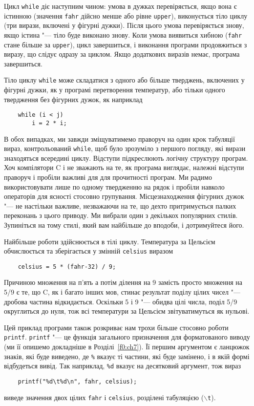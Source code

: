 \documentclass[a4paper,12pt]{book}
\begin{document}
  Цикл \texttt{while} діє наступним чином: умова в дужках перевіряється, якщо вона є
  істинною (значення \texttt{fahr} дійсно менше або рівне \texttt{upper}), виконується
  тіло циклу (три вирази, включені у фігурні дужки). Після цього умова перевіряється
  знову, якщо істина "--- тіло буде виконано знову. Коли умова виявиться хибною
  (\texttt{fahr} стане більше за \texttt{upper}), цикл завершиться, і виконання програми
  продовжиться з виразу, що слідує одразу за циклом. Якщо додаткових виразів немає,
  програма завершиться.

  Тіло циклу
  \texttt{while} може складатися з одного або більше тверджень, включених у фігурні
  дужки, як у програмі перетворення температур, або тільки одного твердження без фігурних
  дужок, як наприклад
  \begin{verbatim}
    while (i < j)
        i = 2 * i;
  \end{verbatim}

  В обох випадках, ми завжди зміщуватимемо праворуч на один крок табуляції вираз,
  контрольований \texttt{while}, щоб було зрозуміло з першого погляду, які вирази
  знаходяться всередині циклу. Відступи підкреслюють логічну структуру програм. Хоч
  компілятори C і не зважають на те, як програма виглядає, належні відступи праворуч і
  пробіли важливі для для прочитності програм. Ми радимо використовувати лише по одному
  твердженню на рядок і пробіли навколо операторів для ясності стосовно групування.
  Місцезнаходження фігурних дужок "--- не настільки важливе, незважаючи на те, що дехто
  притримується палких переконань з цього приводу. Ми вибрали один з декількох популярних
  стилів. Зупиніться на тому стилі, який вам найбільше до вподоби, і дотримуйтеся його.

  Найбільше роботи здійснюється в тілі циклу. Температура за Цельсієм обчислюється та
  зберігається у змінній \texttt{celsius} виразом
  \begin{verbatim}
    celsius = 5 * (fahr-32) / 9;
  \end{verbatim}

  Причиною множення на п'ять а потім ділення на 9 замість просто множення на 5/9 є
  те, що C, як і багато інших мов, стинає результат поділу цілих чисел "--- дробова частина
  відкидається. Оскільки 5 і 9 "--- обидва цілі числа, поділ 5/9 округлиться до нуля, тож
  всі температури за Цельсієм звітуватимуться як нульові.

  Цей приклад програми також розкриває нам трохи більше стосовно роботи \texttt{printf}.
  \texttt{printf} "--- це функція загального призначення для форматованого виводу (ми
  її опишемо докладніше в Розділі~\ref{f0:ch7}). Її першим аргументом є ланцюжок
  знаків, які буде виведено, де \texttt{\%} вказує ті частини, які буде замінено, і в якій
  формі відбудеться вивід. Так наприклад, \texttt{\%d} вказує на десятковий аргумент, тож
  вираз
  \begin{verbatim}
    printf("%d\t%d\n", fahr, celsius);
  \end{verbatim}
  виведе значення двох цілих \texttt{fahr} і \texttt{celsius}, розділені табуляцією
  (\texttt{\mbox{$\backslash$}t}).
\end{document}
